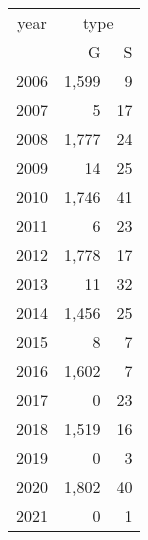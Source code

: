 \footnotesize\begin{tabular}[t]{lrr}
\toprule
\multicolumn{1}{c}{year} & \multicolumn{2}{c}{type} \\
\cmidrule(l{3pt}r{3pt}){1-1} \cmidrule(l{3pt}r{3pt}){2-3}
  & G & S\\
\midrule
2006 & 1,599 & 9\\
2007 & 5 & 17\\
2008 & 1,777 & 24\\
2009 & 14 & 25\\
2010 & 1,746 & 41\\
2011 & 6 & 23\\
2012 & 1,778 & 17\\
2013 & 11 & 32\\
2014 & 1,456 & 25\\
2015 & 8 & 7\\
2016 & 1,602 & 7\\
2017 & 0 & 23\\
2018 & 1,519 & 16\\
2019 & 0 & 3\\
2020 & 1,802 & 40\\
2021 & 0 & 1\\
\bottomrule
\end{tabular}

